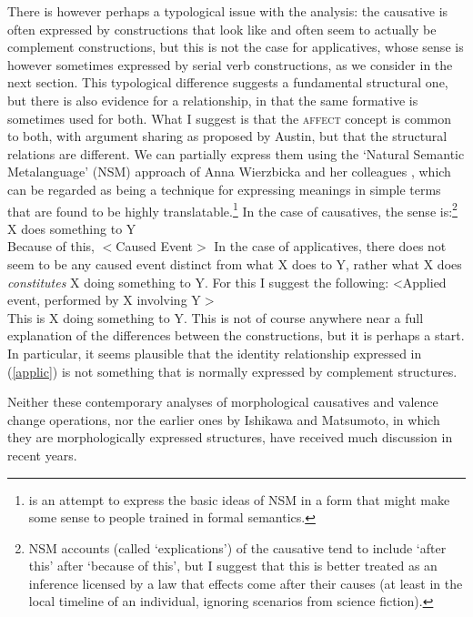 \documentclass[output=paper,hidelinks]{langscibook}
\begin{document}
There is however perhaps a typological issue with the analysis: the causative
is often expressed by constructions that look like and often seem to actually
be complement constructions, but this is not the case for applicatives, whose sense
is however sometimes expressed by serial verb constructions, as we consider in the
next section.  This typological difference suggests a fundamental structural
one, but there is also evidence for a relationship, in that the same formative is
sometimes used for both.  What I suggest is that the \textsc{affect} concept is common to
both, with argument sharing as proposed by Austin, but that the structural relations
are different.  We can partially express them using the `Natural Semantic Metalanguage'
(NSM) approach of Anna Wierzbicka and her colleagues \citep{Wierzbicka:English,Goddard:NSM}, which can be regarded as being
a technique for expressing meanings in simple terms that are found to be highly
translatable.\footnote
 {\citet{Andrews2016} is an attempt to express the basic ideas of NSM in a form
 that might make some sense to people trained in formal semantics.}
In the case of causatives, the sense is:\footnote{NSM accounts (called `explications') of the causative tend to include `after this'
 after `because of this', but I suggest that this is better treated as an inference
 licensed by a law that effects come after their causes (at least in the local timeline
 of an individual, ignoring scenarios from science fiction).}
\ea
X does something to Y\\
Because of this, $<$Caused Event$>$
\z
In the case of applicatives, there does not seem to be any caused event distinct from
what X does to Y, rather what X does \emph{constitutes} X doing something to Y.  For
this I suggest the following:
\ea\label{applic}
<Applied event, performed by X involving Y$>$\\
This is X doing something to Y.
\z
This is not of course anywhere near a full explanation of the differences between
the constructions, but it is perhaps a start.  In particular, it seems plausible
that the identity relationship expressed in (\ref{applic}) is not something that is
normally expressed by complement structures.

Neither these contemporary analyses of morphological causatives
and valence change operations, nor the earlier ones by Ishikawa and Matsumoto, in which
they are morphologically expressed {\XCOMP} structures, have received much discussion
in recent years.
\end{document}

